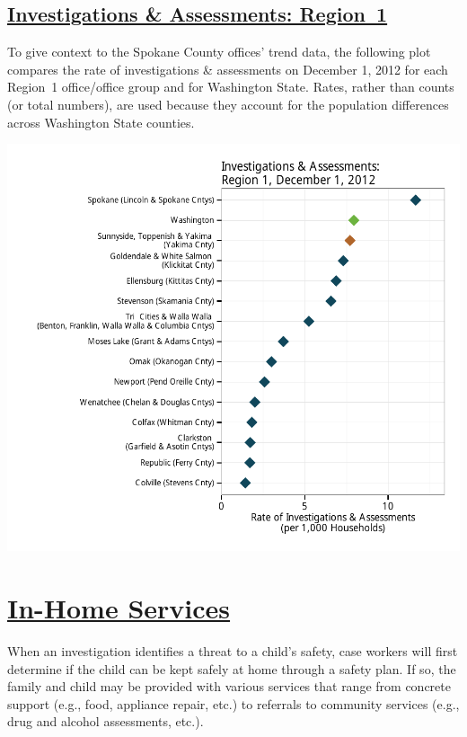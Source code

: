 \documentclass{article}\usepackage[]{graphicx}\usepackage[]{color}
\makeatletter
\def\maxwidth{ %
  \ifdim\Gin@nat@width>\linewidth
    \linewidth
  \else
    \Gin@nat@width
  \fi
}
\newenvironment{knitrout}{}{} %
\makeatother
\begin{document}
\subsection{
    \href{http://www.partnersforourchildren.org//child-well-being/visualizations/investigations-assessments/trends}
    {Investigations \& Assessments: Region~1}}
To give context to the Spokane County offices' trend data, the following plot compares the rate of investigations \& assessments on December 1, 2012 for each Region~1 office/office group and for Washington State.  Rates, rather than counts (or total numbers), are used because they account for the population differences across Washington State counties.
\nopagebreak[3]
\begin{knitrout}
\color{fgcolor}

{\centering \includegraphics[width=\maxwidth]{figure/ia_context} 

}



\end{knitrout}



\newpage
\section{\href{http://www.partnersforourchildren.org/child-well-being/visualizations/home-services/trends}
    {In-Home Services}
}
When an investigation identifies a threat to a child's safety, case workers will first determine if the child can be kept safely at home through a safety plan. If so, the family and child may be provided with various services that range from concrete support (e.g., food, appliance repair, etc.) to referrals to community services (e.g., drug and alcohol assessments, etc.).\\[6pt]
\label{p:ihs}
\end{document}
